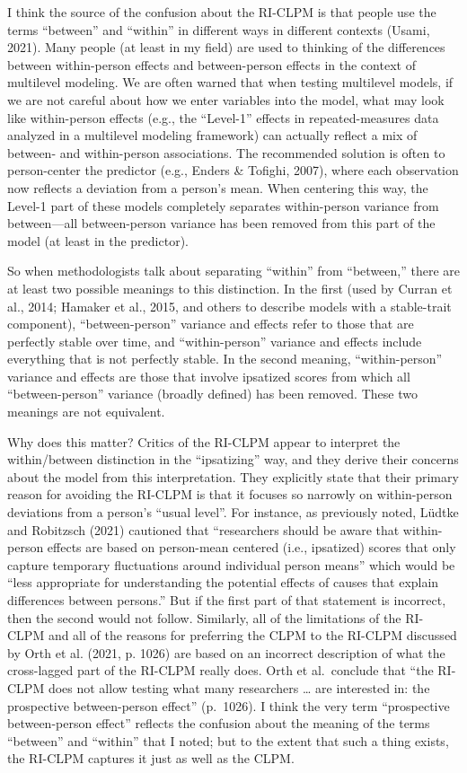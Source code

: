 \documentclass[
  english,
  man,floatsintext]{apa6}
\begin{document}
I think the source of the confusion about the RI-CLPM is that people use the terms ``between'' and ``within'' in different ways in different contexts (Usami, 2021). Many people (at least in my field) are used to thinking of the differences between within-person effects and between-person effects in the context of multilevel modeling. We are often warned that when testing multilevel models, if we are not careful about how we enter variables into the model, what may look like within-person effects (e.g., the ``Level-1'' effects in repeated-measures data analyzed in a multilevel modeling framework) can actually reflect a mix of between- and within-person associations. The recommended solution is often to person-center the predictor (e.g., Enders \& Tofighi, 2007), where each observation now reflects a deviation from a person's mean. When centering this way, the Level-1 part of these models completely separates within-person variance from between---all between-person variance has been removed from this part of the model (at least in the predictor).

So when methodologists talk about separating ``within'' from ``between,'' there are at least two possible meanings to this distinction. In the first (used by Curran et al., 2014; Hamaker et al., 2015, and others to describe models with a stable-trait component), ``between-person'' variance and effects refer to those that are perfectly stable over time, and ``within-person'' variance and effects include everything that is not perfectly stable. In the second meaning, ``within-person'' variance and effects are those that involve ipsatized scores from which all ``between-person'' variance (broadly defined) has been removed. These two meanings are not equivalent.

Why does this matter? Critics of the RI-CLPM appear to interpret the within/between distinction in the ``ipsatizing'' way, and they derive their concerns about the model from this interpretation. They explicitly state that their primary reason for avoiding the RI-CLPM is that it focuses so narrowly on within-person deviations from a person's ``usual level''. For instance, as previously noted, Lüdtke and Robitzsch (2021) cautioned that ``researchers should be aware that within-person effects are based on person-mean centered (i.e., ipsatized) scores that only capture temporary fluctuations around individual person means'' which would be ``less appropriate for understanding the potential effects of causes that explain differences between persons.'' But if the first part of that statement is incorrect, then the second would not follow. Similarly, all of the limitations of the RI-CLPM and all of the reasons for preferring the CLPM to the RI-CLPM discussed by Orth et al. (2021, p. 1026) are based on an incorrect description of what the cross-lagged part of the RI-CLPM really does. Orth et al.~conclude that ``the RI-CLPM does not allow testing what many researchers \ldots{} are interested in: the prospective between-person effect'' (p.~1026). I think the very term ``prospective between-person effect'' reflects the confusion about the meaning of the terms ``between'' and ``within'' that I noted; but to the extent that such a thing exists, the RI-CLPM captures it just as well as the CLPM.
\end{document}
